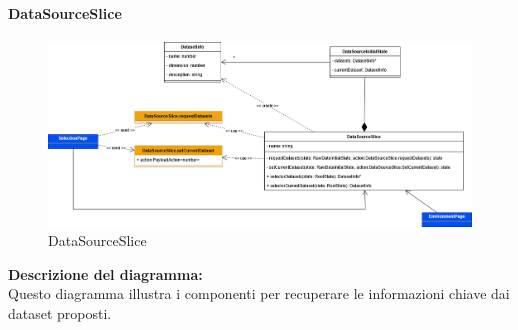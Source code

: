 \paragraph{DataSourceSlice}
\begin{figure}[h!] \centering
    \includegraphics[scale=0.35]{template/images/uml_front/logic/datasourceslice.png}
    \caption{DataSourceSlice}
\end{figure}
\textbf{Descrizione del diagramma:}\\
Questo diagramma illustra i componenti per recuperare le informazioni chiave dai dataset proposti.
